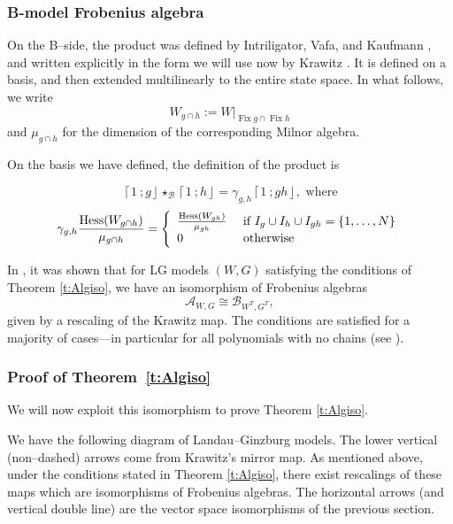 \documentclass[10pt, letterpaper]{amsart}
\theoremstyle{remark}
\newcommand{\sA}{\mathscr{A}}
\newcommand{\sB}{\mathscr{B}}
\newcommand{\fjrw}[2]{ \left\lceil #1 \:; #2 \right\rfloor }
\DeclareMathOperator{\Hess}{Hess}
\DeclareMathOperator{\Fix}{Fix}
\begin{document}
\subsubsection{B-model Frobenius algebra}
On the B--side, the product was defined by Intriligator, Vafa, and Kaufmann \cite{IV, kau1,kau2,kau3}, and written explicitly in the form we will use now by Krawitz \cite{Kr}. It is defined on a basis, and then extended multilinearly to the entire state space. In what follows, we write 
\[
W_{g\cap h}:= W|_{\Fix g \cap \Fix h}
\]
and $\mu_{g\cap h}$ for the dimension of the corresponding Milnor algebra. 

On the basis we have defined, the definition of the product is 

\[
\fjrw{1}{g}\star_{\sB} \fjrw{1}{h} = \gamma_{g,h} \fjrw{1}{gh}, \text{ where}
\]
\[
\gamma_{g,h} \frac{\Hess (W_{g\cap h})}{\mu_{g\cap h}} = \left\{ \begin{array}{l l }
\frac{\Hess (W_{gh})}{\mu_{gh}} & \text{ if } I_g \cup I_h \cup I_{gh} = \{1, \ldots, N\}\\
0 & \text{ otherwise} \\ \end{array}\right.
\]

In \cite{FJJS}, it was shown that for LG models $(W,G)$ satisfying the conditions of Theorem \ref{t:Algiso}, we have an isomorphism of Frobenius algebras
\[
\sA_{W,G}\cong \sB_{W^T,G^T}, 
\]
given by a rescaling of the Krawitz map. 
The conditions are satisfied for a majority of cases---in particular for all polynomials with no chains (see \cite[Remark 1.1.1]{FJJS}). 


\subsubsection{Proof of Theorem~\ref{t:Algiso}}We will now exploit this isomorphism to prove Theorem \ref{t:Algiso}. 

We have the following diagram of Landau--Ginzburg models. The lower vertical (non--dashed) arrows come from Krawitz's mirror map. As mentioned above, under the conditions stated in Theorem \ref{t:Algiso}, there exist rescalings of these maps which are isomorphisms of Frobenius algebras. The horizontal arrows (and vertical double line) are the vector space isomorphisms of the previous section.   
\end{document}
